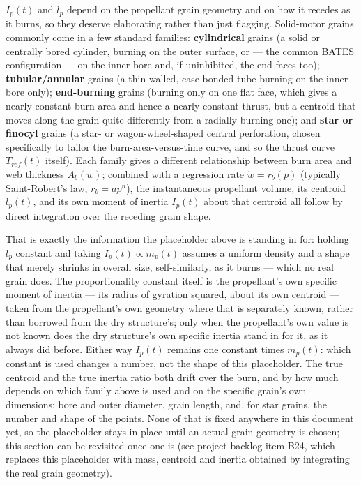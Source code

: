 $I_p(t)$ and $l_p$ depend on the propellant grain geometry and on how it recedes as it burns, so
they deserve elaborating rather than just flagging. Solid-motor grains commonly come in a few
standard families: \textbf{cylindrical} grains (a solid or centrally bored cylinder, burning on
the outer surface, or --- the common BATES configuration --- on the inner bore and, if
uninhibited, the end faces too); \textbf{tubular/annular} grains (a thin-walled, case-bonded tube
burning on the inner bore only); \textbf{end-burning} grains (burning only on one flat face, which
gives a nearly constant burn area and hence a nearly constant thrust, but a centroid that moves
along the grain quite differently from a radially-burning one); and \textbf{star or finocyl}
grains (a star- or wagon-wheel-shaped central perforation, chosen specifically to tailor the
burn-area-versus-time curve, and so the thrust curve $T_{ref}(t)$ itself). Each family gives a
different relationship between burn area and web thickness $A_b(w)$; combined with a regression
rate $\dot{w}=r_b(p)$ (typically Saint-Robert's law, $r_b=ap^n$), the instantaneous propellant
volume, its centroid $l_p(t)$, and its own moment of inertia $I_p(t)$ about that centroid all
follow by direct integration over the receding grain shape.

That is exactly the information the placeholder above is standing in for: holding $l_p$ constant
and taking $I_p(t)\propto m_p(t)$ assumes a uniform density and a shape that merely shrinks in
overall size, self-similarly, as it burns --- which no real grain does. The proportionality
constant itself is the propellant's own specific moment of inertia --- its radius of gyration
squared, about its own centroid --- taken from the propellant's own geometry where that is
separately known, rather than borrowed from the dry structure's; only when the propellant's own
value is not known does the dry structure's own specific inertia stand in for it, as it always did
before. Either way $I_p(t)$ remains one constant times $m_p(t)$: which constant is used changes a
number, not the shape of this placeholder. The true centroid and the true inertia ratio both drift
over the burn, and by how much depends on which family above is used and on the specific grain's
own dimensions: bore and outer diameter, grain length, and, for star grains, the number and shape
of the points. None of that is fixed anywhere in this document yet, so the placeholder stays in
place until an actual grain geometry is chosen; this section can be revisited once one is (see
project backlog item B24, which replaces this placeholder with mass, centroid and inertia obtained
by integrating the real grain geometry).

